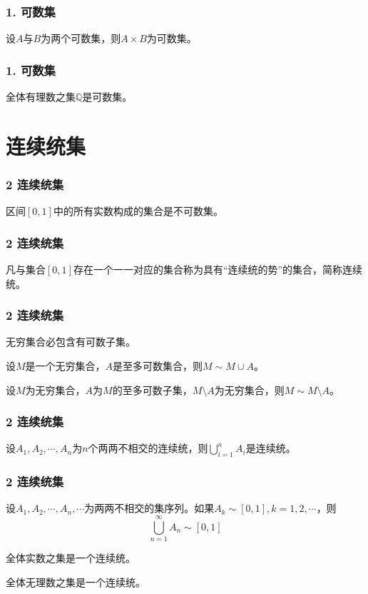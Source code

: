 \documentclass{beamer}
\begin{document}
\begin{CJK*}{UTF8}{gbsn}
\begin{frame}
  \frametitle{1. 可数集}
  \begin{Thm}
    设$A$与$B$为两个可数集，则$A\times B$为可数集。
  \end{Thm}
\end{frame}

\begin{frame}
  \frametitle{1. 可数集}
  \begin{Thm}
    全体有理数之集$\mathbb{Q}$是可数集。
  \end{Thm}
\end{frame}


\section{连续统集}
\begin{frame}
  \frametitle{2 连续统集}
  \begin{Thm}
    区间$[0,1]$中的所有实数构成的集合是不可数集。
  \end{Thm}
\end{frame}

\begin{frame}
  \frametitle{2 连续统集}
  \begin{Def}
    凡与集合$[0,1]$存在一个一一对应的集合称为具有“连续统的势”的集合，简称\alert{连续统}。
  \end{Def}
\end{frame}

\begin{frame}
  \frametitle{2 连续统集}
  \begin{Thm}
    无穷集合必包含有可数子集。
  \end{Thm}\pause
  \begin{Thm}
    设$M$是一个无穷集合，$A$是至多可数集合，则$M \sim M \cup A$。
  \end{Thm}\pause
  \begin{Thm}
    设$M$为无穷集合，$A$为$M$的至多可数子集，$M\setminus A$为无穷集合，则$M \sim M\setminus A$。
  \end{Thm}
\end{frame}
\begin{frame}
  \frametitle{2 连续统集}
  \begin{Thm}
    设$A_1, A_2, \cdots, A_n$为$n$个两两不相交的连续统，则$\bigcup_{i=1}^nA_i$是连续统。
  \end{Thm}
\end{frame}

\begin{frame}
  \frametitle{2 连续统集}
  \begin{Thm}
    设$A_1, A_2, \cdots, A_n, \cdots$为两两不相交的集序列。如果$A_k \sim [0,1], k = 1, 2, \cdots$，则
    \[\bigcup_{n=1}^{\infty}A_n \sim [0,1]\]
  \end{Thm}
  \begin{Cor}
    全体实数之集是一个连续统。
  \end{Cor}
  \begin{Cor}
    全体无理数之集是一个连续统。
  \end{Cor}
\end{frame}


\end{CJK*}
\end{document}
